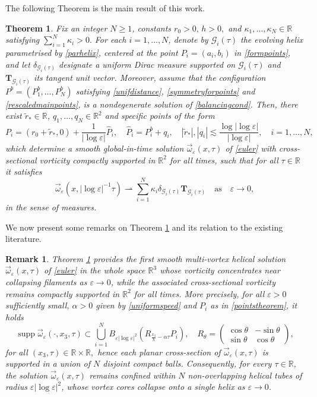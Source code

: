 \documentclass[11pt,reqno,a4paper]{amsart}
\numberwithin{equation}{section}
\newcommand{\R}{\mathbb{R}}
\newcommand{\ve}{\varepsilon}
\newtheorem{theorem}{Theorem}
\newtheorem{remark}{Remark}[section]
\begin{document}
The following Theorem is the main result of this work.
\begin{theorem}\label{maintheorem}
Fix an integer $N\geq 1$, constants $r_0>0,\,h>0,$ and  $\kappa_1,\dots,\kappa_N\in\R$ satisfying $\sum\limits_{i=1}^{N}\kappa_i>0.$ For each $i=1,\dots,N$, denote by $\mathcal{G}_i(\tau)$ the evolving helix parametrised by \eqref{parhelix}, centered at the point $P_i=(a_i,b_i)$ in \eqref{formpoints}, and let $\delta_{\mathcal{G}_i(\tau)}$ designate a uniform Dirac measure supported on $\mathcal{G}_i(\tau)$ and $\mathbf{T}_{\mathcal{G}_i(\tau)}$ its tangent unit vector. Moreover, assume  
that the configuration $P^{b}=\left(P_1^{b},\dots,P_N^{b}\right)$ satisfying \eqref{unifdistance},  \eqref{symmetryforpoints} and \eqref{rescaledmainpoints}, is a nondegenerate solution of  \eqref{balancingcond}. Then, there exist 
$\tilde{r}_{*}\in\R$,  $q_1,\dots,q_N\in\R^2$ and specific points of the form
\begin{equation}\label{pointstheorem}
P_i=(r_0+\tilde{r}_{*},0)+\frac{1}{|\log\ve|}\widehat{P}_i,\quad \widehat{P}_i=P_{i}^{b}+q_i, \quad |\tilde{r}_{*}|, |q_i| \lesssim \frac{\log|\log\ve|}{|\log\ve|}, \quad i=1,\dots,N,
\end{equation}
which determine a smooth global-in-time solution $\vec{\omega}_{\ve}(x,\tau)$ of \eqref{euler} with cross-sectional vorticity compactly supported in $\R^2$ for all times, such that for all $\tau\in\R$ it satisfies
\[\vec{\omega}_{\ve}(x,|\log\ve|^{-1}\tau) \rightharpoonup \sum_{i=1}^{N}\kappa_i\delta_{\mathcal{G}_i(\tau)}\mathbf{T}_{\mathcal{G}_i(\tau)}\quad \mbox{as} \quad \ve\to 0,\]
in the sense of measures. 
\end{theorem}
We now present some remarks on Theorem \ref{maintheorem} and its relation to the existing literature.
\begin{remark}
Theorem \ref{maintheorem} provides the first smooth multi-vortex helical solution $\vec{\omega}_{\ve}(x,\tau)$ of \eqref{euler} in the whole space $\R^3$ whose vorticity concentrates near collapsing filaments as $\ve \to 0$, while the associated cross-sectional vorticity remains compactly supported in $\R^2$ for all times. More precisely, for all  $\ve>0$ sufficiently small, $\alpha>0$ given by \eqref{uniformspeed} and $P_i$ as in \eqref{pointstheorem}, it holds
\begin{equation}\label{remark1prop}
\operatorname{supp}\vec{\omega}_{\ve}(\cdot,x_3,\tau)\subset \bigcup_{i=1}^{N} B_{\ve|\log\ve|^2}\left(R_{\frac{x_3}{h}-\alpha\tau}P_i\right),
\quad R_{\theta}=\begin{pmatrix}\cos\theta&-\sin\theta\\\sin\theta&\cos\theta\end{pmatrix},
\end{equation}
for all $(x_3,\tau)\in\R\times\R,$ hence each planar cross-section of $\vec{\omega}_{\ve}(x,\tau)$ is supported in a union of $N$ disjoint compact balls. Consequently, for every $\tau\in\R$, the solution $\vec{\omega}_{\ve}(x,\tau)$ remains confined within $N$ non-overlapping helical tubes of radius $\ve|\log\ve|^2$, whose vortex cores collapse onto a single helix as $\ve \to 0$.
\end{remark}
\end{document}
